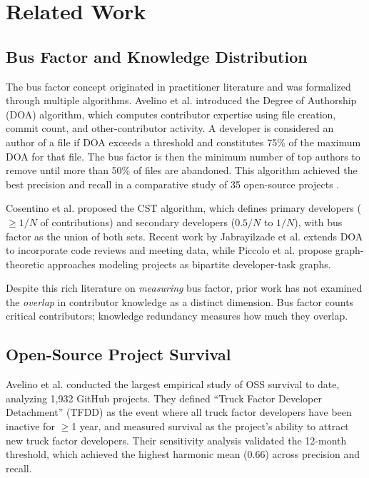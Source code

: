 \documentclass[11pt,letterpaper]{article}
\begin{document}
\section{Related Work}

\subsection{Bus Factor and Knowledge Distribution}

The bus factor concept originated in practitioner literature and was formalized through multiple algorithms. Avelino et al. \cite{Avelino2019} introduced the Degree of Authorship (DOA) algorithm, which computes contributor expertise using file creation, commit count, and other-contributor activity. A developer is considered an author of a file if DOA exceeds a threshold and constitutes 75\% of the maximum DOA for that file. The bus factor is then the minimum number of top authors to remove until more than 50\% of files are abandoned. This algorithm achieved the best precision and recall in a comparative study of 35 open-source projects \cite{Ferreira2019}.

Cosentino et al. \cite{Cosentino2015} proposed the CST algorithm, which defines primary developers ($\geq 1/N$ of contributions) and secondary developers ($0.5/N$ to $1/N$), with bus factor as the union of both sets. Recent work by Jabrayilzade et al. \cite{Jabrayilzade2022} extends DOA to incorporate code reviews and meeting data, while Piccolo et al. \cite{Piccolo2025} propose graph-theoretic approaches modeling projects as bipartite developer-task graphs.

Despite this rich literature on \textit{measuring} bus factor, prior work has not examined the \textit{overlap} in contributor knowledge as a distinct dimension. Bus factor counts critical contributors; knowledge redundancy measures how much they overlap.

\subsection{Open-Source Project Survival}

Avelino et al. \cite{Avelino2019} conducted the largest empirical study of OSS survival to date, analyzing 1,932 GitHub projects. They defined ``Truck Factor Developer Detachment'' (TFDD) as the event where all truck factor developers have been inactive for $\geq$1 year, and measured survival as the project's ability to attract new truck factor developers. Their sensitivity analysis validated the 12-month threshold, which achieved the highest harmonic mean (0.66) across precision and recall.
\end{document}
